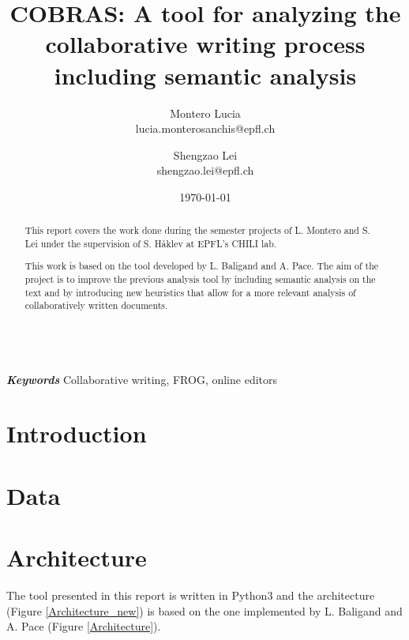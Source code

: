 \documentclass[twocolumn, 12pt]{article}
\title{COBRAS: A tool for analyzing the collaborative writing process including semantic analysis}
\author{
    Montero Lucia\\
    lucia.monterosanchis@epfl.ch
    \and
    Shengzao Lei\\
    shengzao.lei@epfl.ch
}
\date{\today}
\providecommand{\keywords}[1]{\textbf{\textit{\\Keywords }} #1}
\begin{document}
\maketitle

\begin{abstract}
  This report covers the work done during the semester projects of L. Montero and S. Lei under the supervision of S. Håklev at EPFL's CHILI lab.

  This work is based on the tool developed by L. Baligand and A. Pace. The aim of the project is to improve the previous analysis tool by including semantic analysis on the text and by introducing new heuristics that allow for a more relevant analysis of collaboratively written documents.
\end{abstract}

\keywords{Collaborative writing, FROG, online editors}

\section{Introduction}


\section{Data}
  

\section{Architecture}
  The tool presented in this report is written in Python3 and the architecture (Figure \ref{Architecture_new}) is based on the one implemented by L. Baligand and A. Pace \cite{swisstext,FROG-analytics} (Figure \ref{Architecture}). 
\end{document}
